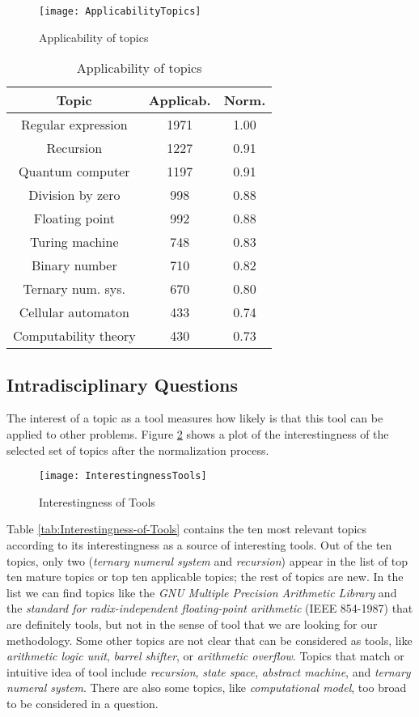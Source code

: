 \begin{figure}[h]
\centering\texttt{[image: ApplicabilityTopics]}
\caption{\label{fig:Applicability-of-Topics}Applicability of topics}
\end{figure}

\begin{table}
\begin{centering}
\begin{tabular}{|c|c|c|}
\hline 
Topic & Applicab. & Norm.\tabularnewline
\hline 
\hline 
Regular expression & 1971 & 1.00\tabularnewline
\hline 
Recursion & 1227 & 0.91\tabularnewline
\hline 
Quantum computer & 1197 & 0.91\tabularnewline
\hline 
Division by zero & 998 & 0.88\tabularnewline
\hline 
Floating point & 992 & 0.88\tabularnewline
\hline 
Turing machine & 748 & 0.83\tabularnewline
\hline 
Binary number & 710 & 0.82\tabularnewline
\hline 
Ternary num. sys. & 670 & 0.80\tabularnewline
\hline 
Cellular automaton & 433 & 0.74\tabularnewline
\hline 
Computability theory & 430 & 0.73\tabularnewline
\hline 
\end{tabular}
\par\end{centering}

\caption{\label{tab:Applicability-of-Topics}Applicability of topics}
\end{table}


\subsection{Intradisciplinary Questions}

The interest of a topic as a tool measures how likely is that this
tool can be applied to other problems. Figure \ref{fig:Interestingness-of-Tools}
shows a plot of the interestingness of the selected set of topics
after the normalization process.

\begin{figure}[h]
\centering\texttt{[image: InterestingnessTools]}
\caption{\label{fig:Interestingness-of-Tools}Interestingness of Tools}
\end{figure}

Table \ref{tab:Interestingness-of-Tools} contains the ten most relevant
topics according to its interestingness as a source of interesting
tools. Out of the ten topics, only two (\emph{ternary numeral system}
and \emph{recursion}) appear in the list of top ten mature topics
or top ten applicable topics; the rest of topics are new. In the list
we can find topics like the \emph{GNU Multiple Precision Arithmetic
Library} and the \emph{standard for radix-independent floating-point
arithmetic} (IEEE 854-1987) that are definitely tools, but not in
the sense of tool that we are looking for our methodology. Some other
topics are not clear that can be considered as tools, like \emph{arithmetic
logic unit}, \emph{barrel shifter}, or \emph{arithmetic overflow}.
Topics that match or intuitive idea of tool include \emph{recursion},
\emph{state space}, \emph{abstract machine}, and \emph{ternary numeral
system}. There are also some topics, like \emph{computational model},
too broad to be considered in a question.

